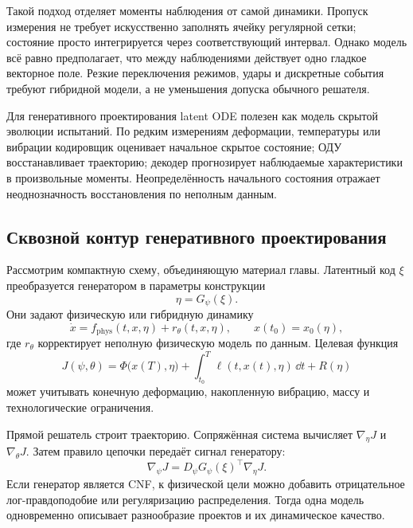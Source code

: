 Такой подход отделяет моменты наблюдения от самой динамики. Пропуск измерения не требует искусственно заполнять ячейку регулярной сетки; состояние просто интегрируется через соответствующий интервал. Однако модель всё равно предполагает, что между наблюдениями действует одно гладкое векторное поле. Резкие переключения режимов, удары и дискретные события требуют гибридной модели, а не уменьшения допуска обычного решателя.

Для генеративного проектирования latent ODE полезен как модель скрытой эволюции испытаний. По редким измерениям деформации, температуры или вибрации кодировщик оценивает начальное скрытое состояние; ОДУ восстанавливает траекторию; декодер прогнозирует наблюдаемые характеристики в произвольные моменты. Неопределённость начального состояния отражает неоднозначность восстановления по неполным данным.

\subsection{Сквозной контур генеративного проектирования}

Рассмотрим компактную схему, объединяющую материал главы. Латентный код $\xi$ преобразуется генератором в параметры конструкции
\[
\eta=G_\psi(\xi).
\]
Они задают физическую или гибридную динамику
\begin{equation}
\label{eq:design-dynamics-v06}
\dot x
=
f_{\mathrm{phys}}(t,x,\eta)
+
r_\theta(t,x,\eta),
\qquad
x(t_0)=x_0(\eta),
\end{equation}
где $r_\theta$ корректирует неполную физическую модель по данным. Целевая функция
\begin{equation}
\label{eq:design-objective-v06}
J(\psi,\theta)
=
\Phi\bigl(x(T),\eta\bigr)
+
\int_{t_0}^{T}\ell(t,x(t),\eta)\,\dd t
+
R(\eta)
\end{equation}
может учитывать конечную деформацию, накопленную вибрацию, массу и технологические ограничения.

Прямой решатель строит траекторию. Сопряжённая система вычисляет $\nabla_\eta J$ и $\nabla_\theta J$. Затем правило цепочки передаёт сигнал генератору:
\begin{equation}
\label{eq:end-to-end-design-gradient-v06}
\nabla_\psi J
=
D_\psi G_\psi(\xi)^\top\nabla_\eta J.
\end{equation}
Если генератор является CNF, к физической цели можно добавить отрицательное лог-правдоподобие или регуляризацию распределения. Тогда одна модель одновременно описывает разнообразие проектов и их динамическое качество.


